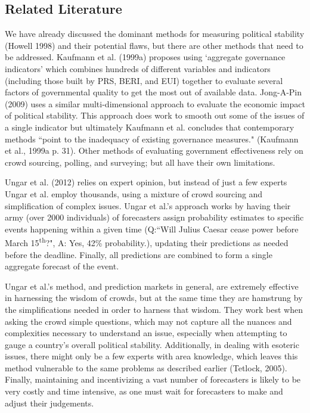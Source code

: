 \documentclass[12pt]{article}
\begin{document}
\begin{spacing}{1.5}
\section*{Related Literature}   

We have already discussed the dominant methods for measuring political stability (Howell 1998) and their potential flaws, but there are other methods that need to be addressed. Kaufmann et al. (1999a) proposes using `aggregate governance indicators' which combines hundreds of different variables and indicators (including those built by PRS, BERI, and EUI) together to evaluate several factors of governmental quality to get the most out of available data. Jong-A-Pin (2009) uses a similar multi-dimensional approach to evaluate the economic impact of political stability. This approach does work to smooth out some of the issues of a single indicator but ultimately Kaufmann et al. concludes that contemporary methods ``point to the inadequacy of existing governance measures." (Kaufmann et al., 1999a p. 31). Other methods of evaluating government effectiveness rely on crowd sourcing, polling, and surveying; but all have their own limitations. 

Ungar et al. (2012) relies on expert opinion, but instead of just a few experts Ungar et al. employ thousands, using a mixture of crowd sourcing and simplification of complex issues. Ungar et al.'s approach works by having their army (over 2000 individuals) of forecasters assign probability estimates to specific events happening within a given time (Q:``Will Julius Caesar cease power before March 15\textsuperscript{th}?", A: Yes, 42\% probability.), updating their predictions as needed before the deadline. Finally, all predictions are combined to form a single aggregate forecast of the event. 

Ungar et al.'s method, and prediction markets in general, are extremely effective in harnessing the wisdom of crowds, but at the same time they are hamstrung by the simplifications needed in order to harness that wisdom. They work best when asking the crowd simple questions, which may not capture all the nuances and complexities necessary to understand an issue, especially when attempting to gauge a country's overall political stability. Additionally, in dealing with esoteric issues, there might only be a few experts with area knowledge, which leaves this method vulnerable to the same problems as described earlier (Tetlock, 2005). Finally, maintaining and incentivizing a vast number of forecasters is likely to be very costly and time intensive, as one must wait for forecasters to make and adjust their judgements. 


\end{spacing}
\end{document}
